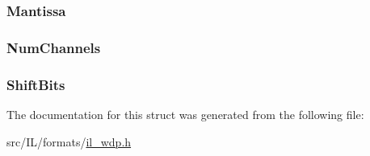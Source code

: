 \hypertarget{struct_w_d_p_i_m_g_p_l_a_n_e_aec7df74767551b66f68538dd6ee027eb}{
\subsubsection[{Mantissa}]{ Mantissa}}\label{struct_w_d_p_i_m_g_p_l_a_n_e_aec7df74767551b66f68538dd6ee027eb}
\hypertarget{struct_w_d_p_i_m_g_p_l_a_n_e_a2e7a9368a1e84df6843b1da996d99fb6}{
\subsubsection[{Num\-Channels}]{ Num\-Channels}}\label{struct_w_d_p_i_m_g_p_l_a_n_e_a2e7a9368a1e84df6843b1da996d99fb6}
\hypertarget{struct_w_d_p_i_m_g_p_l_a_n_e_a8e627de982c32ddf98ba78da2b3b0f9e}{
\subsubsection[{Shift\-Bits}]{ Shift\-Bits}}\label{struct_w_d_p_i_m_g_p_l_a_n_e_a8e627de982c32ddf98ba78da2b3b0f9e}


The documentation for this struct was generated from the following file\-:\begin{DoxyCompactItemize}
\item 
src/\-I\-L/formats/\hyperlink{il__wdp_8h}{il\-\_\-wdp.\-h}\end{DoxyCompactItemize}
